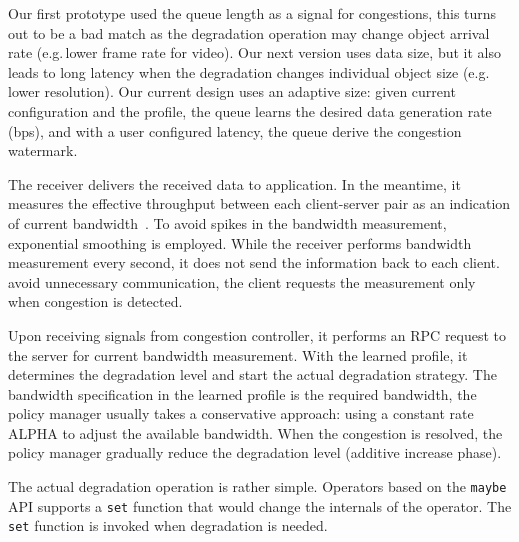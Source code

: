  Our first prototype used the queue length as a
signal for congestions, this turns out to be a bad match as the degradation
operation may change object arrival rate (e.g.\,lower frame rate for video). Our
next version uses data size, but it also leads to long latency when the
degradation changes individual object size (e.g.\,lower resolution). Our current
design uses an adaptive size: given current configuration and the profile, the
queue learns the desired data generation rate (bps), and with a user configured
latency, the queue derive the congestion watermark.

 The receiver delivers the received data to
application. In the meantime, it measures the effective throughput between each
client-server pair as an indication of current bandwidth~\cite{iperf}. To avoid
spikes in the bandwidth measurement, exponential smoothing is employed. While
the receiver performs bandwidth measurement every second, it does not send the
information back to each client.  avoid unnecessary communication, the client
requests the measurement only when congestion is detected.

 Upon receiving signals from congestion controller, it
performs an RPC request to the server for current bandwidth measurement. With
the learned profile, it determines the degradation level and start the actual
degradation strategy. The bandwidth specification in the learned profile is the
required bandwidth, the policy manager usually takes a conservative approach:
using a constant rate ALPHA to adjust the available bandwidth. When the
congestion is resolved, the policy manager gradually reduce the degradation
level (additive increase phase).

 The actual degradation operation is rather simple. Operators
based on the \texttt{maybe} API supports a \texttt{set} function that would
change the internals of the operator. The \texttt{set} function is invoked when
degradation is needed.



